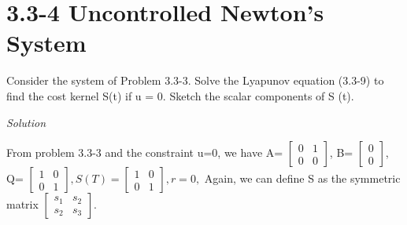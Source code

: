 \documentclass{article}
\begin{document}
  \section{3.3-4 Uncontrolled Newton's System}

  Consider the system of Problem 3.3-3. Solve the Lyapunov equation (3.3-9) to find the cost kernel S(t) if u = 0. Sketch the scalar components of S (t). \newline

  \textit{Solution}
  
  From problem 3.3-3 and the constraint u=0, we have A=
  $\begin{bmatrix}
	  0 & 1 \\
	  0 & 0
  \end{bmatrix}$, B=
  $\begin{bmatrix}
         0 \\
         0 
  \end{bmatrix}$, Q=
  $\begin{bmatrix}
	  1 & 0 \\
          0 & 1
  \end{bmatrix}, S(T)=
  \begin{bmatrix}
	  1 & 0 \\
	  0 & 1
  \end{bmatrix}, r=0, $ \newline
  Again, we can define S as the symmetric matrix
  $\begin{bmatrix}
	  s_1 & s_2 \\
          s_2 & s_3
  \end{bmatrix}$.
\end{document}
